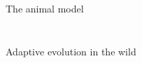 \documentclass[10pt]{beamer}%
\begin{document}
\begin{frame}{The animal model}
{\begin{columns}
\begin{column}[c]{0.6\textwidth}
\begin{figure}
		\end{figure}
	\end{column}
\end{columns}}
	
	\vspace{-0.2cm}
\end{frame}


\begin{frame}%
\end{frame}

\begin{frame}{Adaptive evolution in the wild}

\end{frame}
\end{document}
